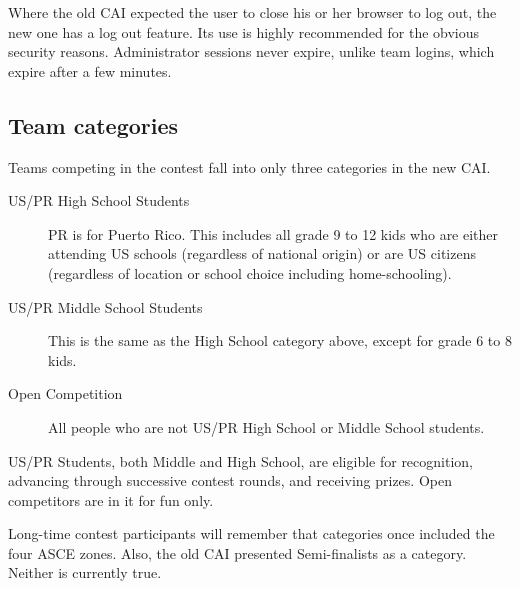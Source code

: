 \documentclass[11pt,letterpaper]{refart}
\begin{document}
Where the old CAI expected the user to close his or her browser to log out, the
new one has a log out feature. Its use is highly recommended for the obvious
security reasons. Administrator sessions never expire, unlike team logins, which
expire after a few minutes.

\subsection{Team categories}
Teams competing in the contest fall into only three categories in the new CAI.
\begin{description}
\item[US/PR High School Students]  PR is for Puerto Rico. This includes all 
grade 9 to 12
kids who are either attending US schools (regardless of national origin) or are
US citizens (regardless of location or school choice including home-schooling).
\item[US/PR Middle School Students]  This is the same as the High School
category above, except for grade 6 to 8 kids.
\item[Open Competition]  All people who are not US/PR High School
or Middle School students.
\end{description}
US/PR Students, both Middle and High School, are eligible for recognition, 
advancing through successive
contest rounds, and receiving prizes. Open competitors are in it for fun only.

Long-time contest participants will remember that categories once included the
four ASCE zones. Also, the old CAI presented Semi-finalists as a category.
Neither is currently true.
\end{document}

